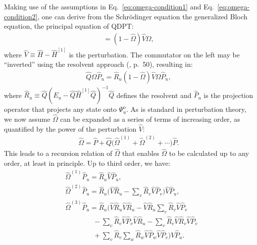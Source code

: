 Making use of the assumptions in Eq.\ \eqref{eq:omega-condition1} and Eq.\ \eqref{eq:omega-condition2}, one can derive from the Schr\"odinger equation the generalized Bloch equation, the principal equation of QDPT:
\begin{gather*}
  [\hat \Omega, \hat{H}^{[1]}] =
  (1 - \hat \Omega) \hat V \Omega,
\end{gather*}
where $\hat V \equiv \hat H - \hat{H}^{[1]}$ is the perturbation.  The commutator on the left may be ``inverted'' using the resolvent approach (\cite{shavitt2009many}, p.\ 50), resulting in:
\begin{align*}
  \hat Q \Omega \hat P_u =
  \hat R_u (1 - \hat \Omega) \hat V \Omega \hat P_u,
\end{align*}
where $\hat R_u \equiv \hat Q (E_u - \hat Q \hat{H}^{[1]} \hat Q)^{-1} \hat Q$ defines the resolvent and $\hat P_u$ is the projection operator that projects any state onto $\Psi^{\mathrm{o}}_u$.  As is standard in perturbation theory, we now assume $\hat \Omega$ can be expanded as a series of terms of increasing order, as quantified by the power of the perturbation $\hat V$:
\begin{align*}
  \hat \Omega = \hat P +
  \hat Q\bigl(\hat \Omega^{(1)} + \hat \Omega^{(2)} + \cdots\bigr) \hat P.
\end{align*}
This leads to a recursion relation of $\hat \Omega$ that enables $\hat \Omega$ to be calculated up to any order, at least in principle.  Up to third order, we have:
\begin{align*}
  &\hat \Omega^{(1)} \hat P_u = \hat R_u \hat V \hat P_u, \\
  &\hat \Omega^{(2)} \hat P_u =
    \hat R_u \biggl(
    \hat V \hat R_u
    - \sum_v \hat R_v \hat V \hat P_v
    \biggr) \hat V \hat P_u, \\
  &\hat \Omega^{(3)} \hat P_u =
    \hat R_u \biggl(
    \hat V \hat R_u \hat V \hat R_u
    - \hat V \hat R_u \sum_v \hat R_v \hat V \hat P_v \\
  &\qquad\qquad
    - \sum_v \hat R_v \hat V \hat P_v \hat V \hat R_u
    - \sum_v \hat R_v \hat V \hat R_v \hat V \hat P_v \\
  &\qquad\qquad
    + \sum_v \hat R_v \sum_w \hat R_w \hat V \hat P_w \hat V \hat P_v
    \biggr) \hat V \hat P_u.
\end{align*}

